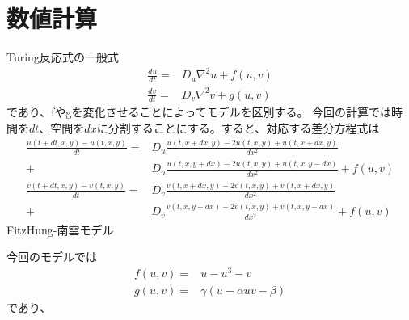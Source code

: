 \documentclass{jsarticle}
\theoremstyle{definition}
\begin{document}
\part{数値計算}\label{Numarical Analysis}
Turing反応式の一般式
\begin{align}\label{Turing_reaction_eq}
    \frac{du}{dt}=&D_u \nabla^2 u+f(u,v)\\
    \frac{dv}{dt}=&D_v \nabla^2 v+g(u,v)
\end{align}
であり、fやgを変化させることによってモデルを区別する。
今回の計算では時間を$dt$、空間を$dx$に分割することにする。すると、対応する差分方程式は
\begin{align*}
    \frac{u(t+dt,x,y)-u(t,x,y)}{dt}=&D_u\frac{u(t,x+dx,y)-2u(t,x,y)+u(t,x+dx,y)}{dx^2}\\
    +& D_u\frac{u(t,x,y+dx)-2u(t,x,y)+u(t,x,y-dx)}{dx^2}+f(u,v)\\
    \frac{v(t+dt,x,y)-v(t,x,y)}{dt}=&D_v\frac{v(t,x+dx,y)-2v(t,x,y)+v(t,x+dx,y)}{dx^2}\\
    +& D_v\frac{v(t,x,y+dx)-2v(t,x,y)+v(t,x,y-dx)}{dx^2}+f(u,v)
\end{align*}
  FitzHung-南雲モデル

今回のモデルでは
\begin{align}
    f(u,v)=&u-u^3-v\\
    g(u,v)=&γ(u-αuv-β)
\end{align}
であり、



\end{document}
